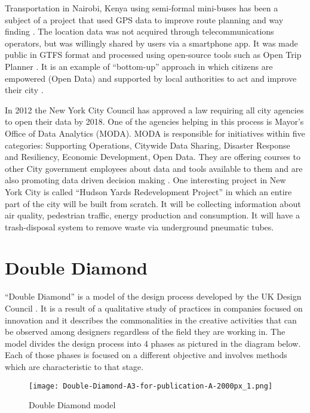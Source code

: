 Transportation in Nairobi, Kenya using semi-formal mini-buses has been a subject of a project that used GPS data to improve route planning and way finding \citep{klopp2015leveraging}. The location data was not acquired through telecommunications operators, but was willingly shared by users via a smartphone app. It was made public in GTFS format and processed using open-source tools such as Open Trip Planner \citep{klopp2015leveraging}. It is an example of “bottom-up” approach in which citizens are empowered (Open Data) and supported by local authorities to act and improve their city \citep{Neirotti2014}.

In 2012 the New York City Council has approved a law requiring all city agencies to open their data by 2018. One of the agencies helping in this process is Mayor’s Office of Data Analytics (MODA). MODA is responsible for initiatives within five categories: Supporting Operations, Citywide Data Sharing, Disaster Response and Resiliency, Economic Development, Open Data. They are offering courses to other City government employees about data and tools available to them and are also promoting data driven decision making \citep{NYCMODA2014}. One interesting project in New York City is called “Hudson Yards Redevelopment Project” in which an entire part of the city will be built from scratch. It will be collecting information about air quality, pedestrian traffic, energy production and consumption. It will have a trash-disposal system to remove waste via underground pneumatic tubes.

	\section{Double Diamond}
	
“Double Diamond” is a model of the design process developed by the UK Design Council \citep{council2007eleven, council2005double}. It is a result of a qualitative study of practices in companies focused on innovation and it describes the commonalities in the creative activities that can be observed among designers regardless of the field they are working in. The model divides the design process into 4 phases as pictured in the diagram below. Each of those phases is focused on a different objective and involves methods which are characteristic to that stage.

\begin{figure}[h!]
\centering
     \texttt{[image: Double-Diamond-A3-for-publication-A-2000px\_1.png]}
      \caption{Double Diamond model \citep{council2005double} }
       \label{normal_case}
\end{figure}

